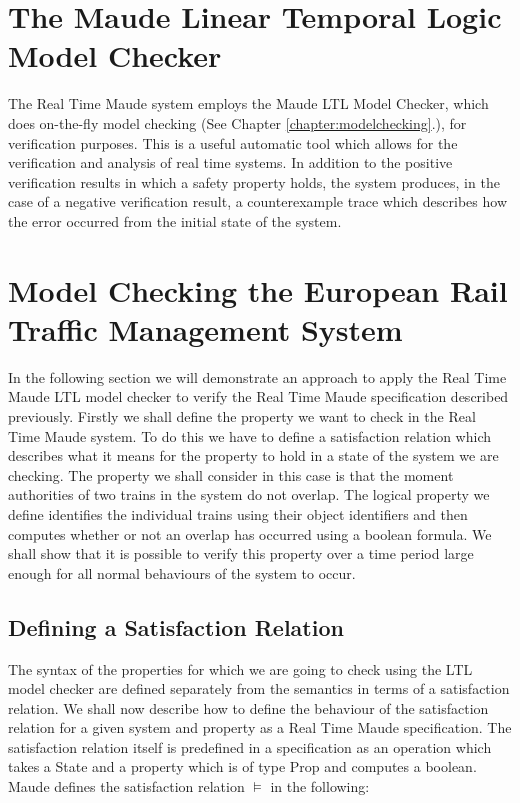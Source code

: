 \section{The Maude Linear Temporal Logic Model Checker}
The Real Time Maude system employs the Maude LTL Model Checker, which does on-the-fly model checking (See Chapter \ref{chapter:modelchecking}.), for \cite{ES00} verification purposes.  This is a useful automatic tool which allows for the verification and analysis of real time systems. In addition to the positive verification results in which a safety property holds,  the system produces, in the case of a negative verification result, a counterexample trace which describes how the error occurred from the initial state of the system.

 

\section{Model Checking the European Rail Traffic Management System}
In the following section we will demonstrate an approach to apply the Real Time Maude LTL model checker to verify the Real Time Maude specification described previously.
Firstly we shall define the property we want to check in the Real Time Maude system. To do this we have to define a satisfaction relation which describes what it means for the property to hold in a state of the system we are checking. The property we shall consider in this case is that the moment authorities of two trains in the system do not overlap. The logical property we define identifies the individual trains using their object identifiers and then computes whether or not an overlap has occurred using a boolean formula.  We shall show that it is possible to verify this property over a time period large enough for all normal behaviours of the system to occur. 

\subsection*{Defining a Satisfaction Relation}
The syntax of the properties for which we are going to check using the LTL model checker are defined separately from the semantics in terms of a satisfaction relation.
We shall now describe how to define the behaviour of the satisfaction relation for a given system and property as a Real Time Maude specification. The satisfaction relation itself is predefined in a specification as an operation which takes a State and a property which is of type Prop and computes a boolean. Maude defines the satisfaction relation $\models$ in the following:
\medskip

